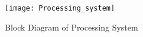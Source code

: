 \begin{figure}[h]
    \centering
    \texttt{[image: Processing\_system]}
    \caption{Block Diagram of Processing System}
    \label{fig:1}
\end{figure}